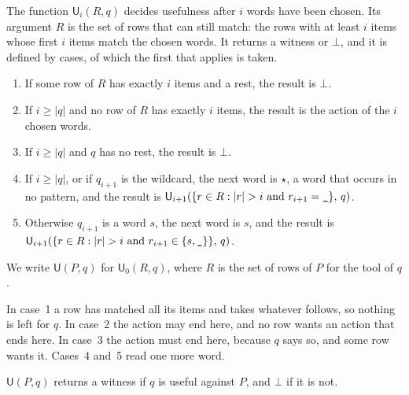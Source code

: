 \documentclass[acmsmall,nonacm,screen]{acmart}
\newcommand{\kw}[1]{\mathsf{#1}}
\newcommand{\any}{\textup{\texttt{\_}}}
\newcommand{\U}{\kw{U}}
\newcommand{\fresh}{\star}
\begin{document}
The function $\U_i(R, q)$ decides usefulness after $i$ words have been chosen. Its argument
$R$ is the set of rows that can still match: the rows with at least $i$ items whose first $i$
items match the chosen words. It returns a witness or $\bot$, and it is defined by cases, of
which the first that applies is taken.
\begin{enumerate}
\item If some row of $R$ has exactly $i$ items and a rest, the result is $\bot$.
\item If $i \ge |q|$ and no row of $R$ has exactly $i$ items, the result is the action of
  the $i$ chosen words.
\item If $i \ge |q|$ and $q$ has no rest, the result is $\bot$.
\item If $i \ge |q|$, or if $q_{i+1}$ is the wildcard, the next word is $\fresh$, a word that
  occurs in no pattern, and the result is $\U_{i+1}(\{r \in R : |r| > i \text{ and } r_{i+1}
  = \any\},\, q)$.
\item Otherwise $q_{i+1}$ is a word $s$, the next word is $s$, and the result is
  $\U_{i+1}(\{r \in R : |r| > i \text{ and } r_{i+1} \in \{s, \any\}\},\, q)$.
\end{enumerate}
We write $\U(P, q)$ for $\U_0(R, q)$, where $R$ is the set of rows of $P$ for the tool of
$q$.

In case~1 a row has matched all its items and takes whatever follows, so nothing is left for
$q$. In case~2 the action may end here, and no row wants an action that ends here. In case~3
the action must end here, because $q$ says so, and some row wants it. Cases~4 and~5 read one
more word.

\begin{theorem}[Usefulness]\label{thm:useful}
$\U(P, q)$ returns a witness if $q$ is useful against $P$, and $\bot$ if it is not.
\end{theorem}
\end{document}
